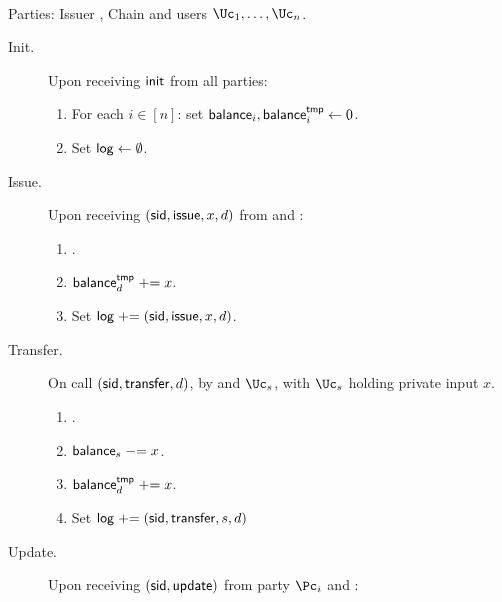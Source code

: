 \begin{functionality}\label{func:ConfidentialTransactions}~
	
	\item[Parties:]	Issuer \Ic, Chain \Cc and users  $\Uc_1, \ldots,\Uc_n$.
	
	\begin{description}
		\item[Init.] Upon receiving $\mathsf{init}$ from  all parties: 
		\begin{enumerate}
			\item  For each $i\in [n]$: set $\mathsf{balance}_i,\mathsf{balance}_i^{\mathsf{tmp}} \leftarrow 0$.
			
			\item Set $\mathsf{log} \leftarrow \emptyset$.
		\end{enumerate}
		
			\item[Issue.]   Upon receiving $(\mathsf{sid},\mathsf{issue},x,d)$ from  \Vc and \Ic:
		\begin{enumerate}
			
			
			\item {}.
			
			\item $\mathsf{balance}_d^{\mathsf{tmp}} \mathrel{+}= x$.
			
			\item Set $\mathsf{log} \mathrel{+}= (\mathsf{sid},\mathsf{issue},x,d)$.
		\end{enumerate}
		
		
		\item[Transfer.]    On call  $(\mathsf{sid},\mathsf{transfer},d)$, by  \Cc and  $\Uc_s$, with  $\Uc_s$ holding private input $x$. 
		
	
		\begin{enumerate}
			\item {}.
			
			\item $\mathsf{balance}_s \mathrel{-}= x$.
			
			\item $\mathsf{balance}^{\mathsf{tmp}}_d \mathrel{+}= x$.
			
			\item Set $\mathsf{log} \mathrel{+}= (\mathsf{sid},\mathsf{transfer},s,d)$
			
		\end{enumerate}
		
		\item[Update.]     Upon receiving $(\mathsf{sid},\mathsf{update})$ from  party $\Pc_i$ and \Cc:  \Cc
		

\end{description}
\end{functionality}
